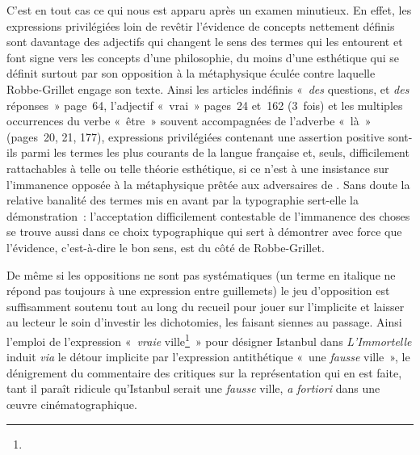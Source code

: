 \documentclass[12pt, a4paper]{article}
\begin{document}
C'est en tout cas ce qui nous est apparu après un examen minutieux. En effet, les expressions privilégiées loin de revêtir l'évidence de concepts nettement définis sont davantage des adjectifs qui changent le sens des termes qui les entourent et font signe vers les concepts d'une philosophie, du moins d'une esthétique qui se définit surtout par son opposition à la métaphysique éculée contre laquelle Robbe-Grillet engage son texte. Ainsi les articles indéfinis «~\textit{des} questions, et \textit{des} réponses~» page~64, l'adjectif «~vrai~» pages~24 et~162 (3~fois) et les multiples occurrences du verbe «~être~» souvent accompagnées de l'adverbe «~là~» (pages~20, 21, 177), expressions privilégiées contenant une assertion positive sont-ils parmi les termes les plus courants de la langue française et, seuls, difficilement rattachables à telle ou telle théorie esthétique, si ce n'est à une insistance sur l'immanence opposée à la métaphysique prêtée aux adversaires de \robbe{}. Sans doute la relative banalité des termes mis en avant par la typographie sert-elle la démonstration~: l'acceptation difficilement contestable de l'immanence des choses  se trouve aussi dans ce choix typographique qui sert à démontrer avec force que l'évidence, c'est-à-dire le bon sens, est du côté de Robbe-Grillet.






De même si les oppositions ne sont pas systématiques (un terme en italique ne répond pas toujours à une expression entre guillemets) le jeu d'opposition est suffisamment soutenu tout au long du recueil pour jouer sur l'implicite et laisser au lecteur le soin d'investir les dichotomies, les faisant siennes au passage. Ainsi l'emploi de l'expression «~\textit{vraie} ville\footnote{}~» pour désigner Istanbul dans \textit{L'Immortelle} induit \textit{via} le détour implicite par l'expression antithétique «~une \textit{fausse} ville~», le dénigrement du commentaire des critiques sur la représentation qui en est faite, tant il paraît ridicule qu'Istanbul serait une \textit{fausse} ville, \textit{a fortiori} dans une œuvre cinématographique.



\end{document}
